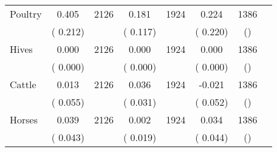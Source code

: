 \begin{tabular}{l*{6}{c}}
Poultry        &              0.405      &       2126       &              0.181      &       1924       &              0.224      &       1386  &  &              \\
                       &       (       0.212)            &                               &       (       0.117)            &                               &       (       0.220)            &       () &                  \\
Hives        &              0.000      &       2126       &              0.000      &       1924       &              0.000      &       1386  &  &              \\
                       &       (       0.000)            &                               &       (       0.000)            &                               &       (       0.000)            &       () &                  \\
Cattle        &              0.013      &       2126       &              0.036      &       1924       &             -0.021      &       1386  &  &              \\
                       &       (       0.055)            &                               &       (       0.031)            &                               &       (       0.052)            &       () &                  \\
Horses        &              0.039      &       2126       &              0.002      &       1924       &              0.034      &       1386  &  &              \\
                       &       (       0.043)            &                               &       (       0.019)            &                               &       (       0.044)            &       () &                  \\
\hline \end{tabular}